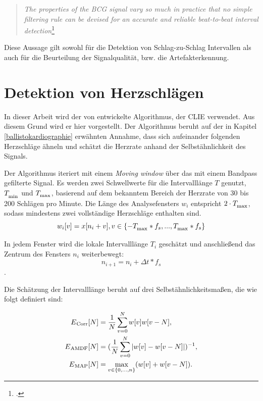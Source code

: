 	\begin{quote}\textit{The properties of the BCG signal vary so much in practice that no simple filtering rule can be devised for an accurate and reliable beat-to-beat interval detection}\footcite{Paalasmaa2015}\end{quote}
	
	Diese Aussage gilt sowohl für die Detektion von Schlag-zu-Schlag Intervallen als auch für die Beurteilung der Signalqualität, bzw. die Artefakterkennung.

\section{Detektion von Herzschlägen}\label{CLIE}

	In dieser Arbeit wird der von \citeauthor{Bruser2013} entwickelte Algorithmus, der \acf{CLIE} verwendet. Aus diesem Grund wird er hier vorgestellt. Der Algorithmus beruht auf der in Kapitel \ref{ballistokardiographie} erwähnten Annahme, dass sich aufeinander folgenden Herzschläge ähneln und schätzt die Herzrate anhand der Selbstähnlichkeit des Signals.


	Der Algorithmus iteriert mit einem \textit{Moving window} über das mit einem Bandpass gefilterte Signal. Es werden zwei Schwellwerte für die Intervalllänge $T$ genutzt, $T_\textsubscript{min}$ und $T_\textsubscript{max}$, basierend auf dem bekanntem Bereich der Herzrate von 30 bis 200 Schlägen pro Minute. Die Länge des Analysefensters $w_i$ entspricht $2 \cdot T_\textsubscript{max}$, sodass mindestens zwei vollständige Herzschläge enthalten sind.
	\[w_i[v] = x[n_i + v], v \in \{ -T_\textsubscript{max} * f_s, ..., T_\textsubscript{max} * f_s\}\]
	
	In jedem Fenster wird die lokale Intervalllänge $T_i$ geschätzt und anschließend das Zentrum des Fensters $n_i$ weiterbewegt: \[ n_{i+1} = n_i + \Delta t * f_s \].
	
	Die Schätzung der Intervalllänge beruht auf drei Selbstähnlichkeitsmaßen, die wie folgt definiert sind:
	
	\begin{align*}
		E\textsubscript{Corr}[N] &= \frac{1}{N} \sum_{v=0}^{N} w[v]w[v-N],\\
		E\textsubscript{AMDF}[N] &= (\frac{1}{N} \sum_{v=0}^{N} |w[v]-w[v-N]|)^{-1},\\
		E\textsubscript{MAP}[N] &= \max_{v \in \{0,...,n\}}(w[v]+w[v-N]).
	\end{align*}
 	
